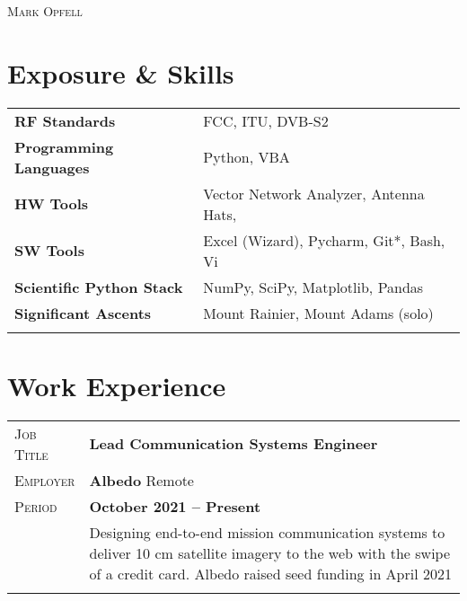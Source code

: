 \documentclass[a4paper, oneside, final]{scrartcl}
\newcommand{\gray}{\rowcolor[gray]{.90}} %
\begin{document}
\begin{center} %

\pdfpageheight 11in 
\pdfpagewidth 8.5in


{\fontsize{36}{36}\selectfont\scshape Mark Opfell} 
\vspace{1.16 cm} %


\section{Exposure \& Skills}
\begin{tabular}{ @{} >{\bfseries}l @{\hspace{6ex}} l }
RF Standards & FCC, ITU, DVB-S2 \\
Programming Languages & Python, VBA\\
HW Tools & Vector Network Analyzer, Antenna Hats,\\
SW Tools & Excel (Wizard), Pycharm, Git*, Bash, Vi\\
Scientific Python Stack & NumPy, SciPy, Matplotlib, Pandas \\
Significant Ascents & Mount Rainier, Mount Adams (solo)\\%
\\
\end{tabular}

\section{Work Experience}

\begin{tabularx}{0.97\linewidth}{>{\raggedleft\scshape}p{2cm}X}
\gray Job Title & \textbf{Lead Communication Systems Engineer}\\
\gray Employer & \textbf{Albedo} \hfill Remote\\
\gray Period & \textbf{October 2021 -- Present}\\
&
\vspace{-0.15 cm}
Designing end-to-end mission communication systems to deliver 10 cm satellite imagery to the web with the swipe of a credit card.
\newline
\newline
Albedo raised seed funding in April 2021
\\
\\
\end{tabularx}


\end{center}
\end{document}
